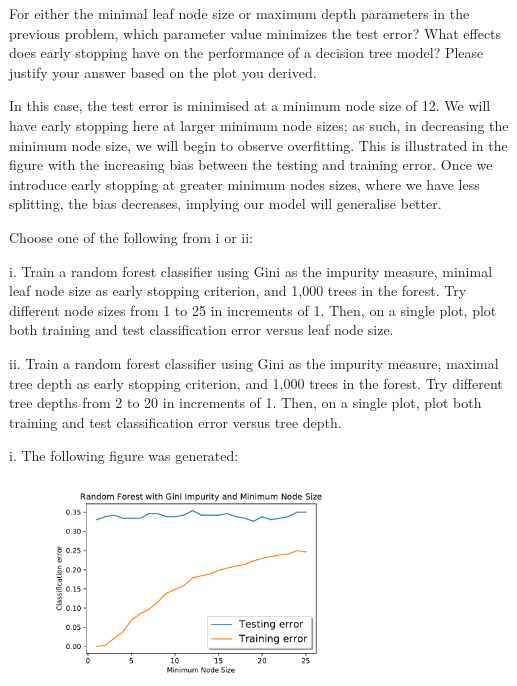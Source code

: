 \problem[6]
For either the minimal leaf node size or maximum depth parameters in the previous problem, which parameter value minimizes the test error? What effects does early stopping have on the performance of a decision tree model?
Please justify your answer based on the plot you derived.

\begin{solution}
   In this case, the test error is minimised at a minimum node size of 12. We will have early stopping here at larger minimum node sizes; as such, in decreasing the minimum node size, we will begin to observe overfitting. This is illustrated in the figure with the increasing bias between the testing and training error. Once we introduce early stopping at greater minimum nodes sizes, where we have less splitting, the bias decreases, implying our model will generalise better.
\end{solution}

\indent\problem[4] Choose one of the following from i or ii: \smallskip 

\noindent i. Train a random forest classifier using Gini as the impurity measure, minimal leaf node size as early stopping criterion, and 1,000 trees in the forest. Try different node sizes from 1 to 25 in increments of 1. Then, on a single plot, plot both training and test classification error versus
leaf node size.

ii. Train a random forest classifier using Gini as the impurity measure, maximal tree depth as early stopping criterion, and 1,000 trees in the forest. Try different tree depths from 2 to 20 in increments of 1. Then, on a single plot, plot both training and test classification error versus tree depth.

\begin{solution}
    i. The following figure was generated:
    \begin{figure}[H]
        \begin{center}
        \includegraphics[width=0.7\textwidth]{RT_min_leaf.pdf}
        \end{center}
        \end{figure}
\end{solution}

